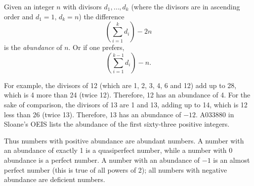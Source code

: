 \documentclass[12pt]{article}
\begin{document}
Given an integer $n$ with divisors $d_1, \ldots , d_k$ (where the divisors are in ascending order and $d_1 = 1$, $d_k = n$) the difference $$\left( \sum_{i = 1}^k d_i \right) - 2n$$ is the {\em abundance} of $n$. Or if one prefers, $$\left( \sum_{i = 1}^{k - 1} d_i \right) - n.$$

For example, the divisors of 12 (which are 1, 2, 3, 4, 6 and 12) add up to 28, which is 4 more than 24 (twice 12). Therefore, 12 has an abundance of 4. For the sake of comparison, the divisors of 13 are 1 and 13, adding up to 14, which is 12 less than 26 (twice 13). Therefore, 13 has an abundance of $-12$. A033880 in Sloane's OEIS lists the abundance of the first sixty-three positive integers.

Thus numbers with positive abundance are abundant numbers. A number with an abundance of exactly 1 is a quasiperfect number, while a number with 0 abundance is a perfect number. A number with an abundance of $-1$ is an almost perfect number (this is true of all powers of 2); all numbers with negative abundance are deficient numbers.
\end{document}
